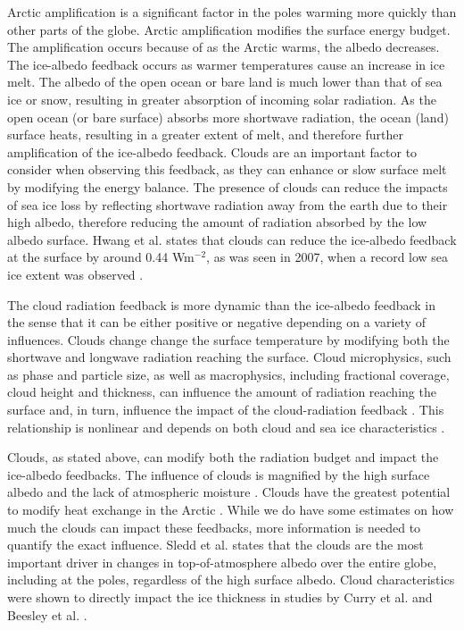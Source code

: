 Arctic amplification is a significant factor in the poles warming more quickly than other parts of the globe. Arctic amplification modifies the surface energy budget. The amplification occurs because of as the Arctic warms, the albedo decreases. The ice-albedo feedback occurs as warmer temperatures cause an increase in ice melt. The albedo of the open ocean or bare land is much lower than that of sea ice or snow, resulting in greater absorption of incoming solar radiation. As the open ocean (or bare surface) absorbs more shortwave radiation, the ocean (land) surface heats, resulting in a greater extent of melt, and therefore further amplification of the ice-albedo feedback. Clouds are an important factor to consider when observing this feedback, as they can enhance or slow surface melt by modifying the energy balance. The presence of clouds can reduce the impacts of sea ice loss by reflecting shortwave radiation away from the earth due to their high albedo, therefore reducing the amount of radiation absorbed by the low albedo surface. Hwang et al. \cite{Hwang:2018jb} states that clouds can reduce the ice-albedo feedback at the surface by around 0.44 Wm$^{-2}$, as was seen in 2007, when a record low sea ice extent was observed \cite{Hwang:2018jb} \cite{Sledd:2019bz}.

The cloud radiation feedback is more dynamic than the ice-albedo feedback in the sense that it can be either positive or negative depending on a variety of influences. Clouds change change the surface temperature by modifying both the shortwave and longwave radiation reaching the surface. Cloud microphysics, such as phase and particle size, as well as macrophysics, including fractional coverage, cloud height and thickness, can influence the amount of radiation reaching the surface and, in turn, influence the impact of the cloud-radiation feedback \cite{Uttal:2002vw}. This relationship is nonlinear and depends on both cloud and sea ice characteristics \cite{Intrieri:2002cn}.

Clouds, as stated above, can modify both the radiation budget and impact the ice-albedo feedbacks. The influence of clouds is magnified by the high surface albedo and the lack of atmospheric moisture \cite{Shupe:2003vt}. Clouds have the greatest potential to modify heat exchange in the Arctic \cite{Intrieri:2002cn}. While we do have some estimates on how much the clouds can impact these feedbacks, more information is needed to quantify the exact influence. Sledd et al. \cite{Sledd:2019bz} states that the clouds are the most important driver in changes in top-of-atmosphere albedo over the entire globe, including at the poles, regardless of the high surface albedo. Cloud characteristics were shown to directly impact the ice thickness in studies by Curry et al. \cite{Curry:1992vn} and Beesley et al. \cite{Beesley:2007vg}.  

